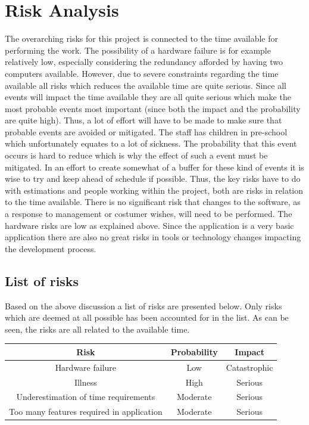 \documentclass[12pt, letterpaper]{article}
\begin{document}
\section{Risk Analysis}
The overarching risks for this project is connected to the time available for performing the work. The possibility of a hardware failure is for example relatively low, especially considering the redundancy afforded by having two computers available. However, due to severe constraints regarding the time available all risks which reduces the available time are quite serious. Since all events will impact the time available they are all quite serious which make the most probable events most important (since both the impact and the probability are quite high). Thus, a lot of effort will have to be made to make sure that probable events are avoided or mitigated. The staff has children in pre-school which unfortunately equates to a lot of sickness. The probability that this event occurs is hard to reduce which is why the effect of such a event must be mitigated. In an effort to create somewhat of a buffer for these kind of events it is wise to try and keep ahead of schedule if possible.
\newline
\newline
Thus, the key risks have to do with estimations and people working within the project, both are risks in relation to the time available. There is no significant risk that changes to the software, as a response to management or costumer wishes, will need to be performed. The hardware risks are low as explained above. Since the application is a very basic application there are also no great risks in tools or technology changes impacting the development process. 
\subsection{List of risks}
Based on the above discussion a list of risks are presented below. Only risks which are deemed at all possible has been accounted for in the list. As can be seen, the risks are all related to the available time.
\begin{center}
	\begin{tabular}{|c|c|c|} 
		\hline
		Risk & Probability & Impact\\ [0.5ex] 
		\hline\hline
		Hardware failure & Low & Catastrophic \\ 
		\hline
		Illness & High & Serious \\
		\hline
		Underestimation of time requirements & Moderate & Serious \\ 
		\hline
		Too many features required in application & Moderate & Serious \\ 
		\hline
		
	\end{tabular}
\end{center}
\end{document}
